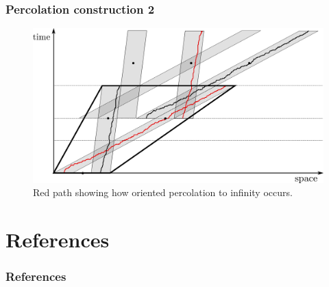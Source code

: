 \documentclass{beamer}
\begin{document}
\begin{frame}
\frametitle{Percolation construction 2}
\pause
\begin{figure}[!h]
\includegraphics[scale=0.85]{images/simple_tiling}
\caption{Red path showing how oriented percolation to infinity occurs. }
\end{figure}
\end{frame}

\section{References}
\begin{frame}
\frametitle{References}
\printbibliography
%
%
\end{frame}
\end{document}
